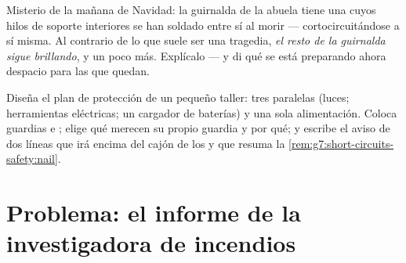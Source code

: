 \begin{exercise}[$\star\star$]\label{exo:g7:short-circuits-safety:11}
Misterio de la mañana de Navidad: la guirnalda  de la abuela
tiene una  cuyos hilos de soporte interiores se han soldado
entre sí al morir --- cortocircuitándose a sí misma. Al contrario de
lo que suele ser una tragedia, \emph{el resto de la guirnalda sigue
brillando}, y un poco más. Explícalo --- y di qué se está preparando
ahora despacio para las  que quedan.
\end{exercise}

\begin{exercise}[$\star\star\star$]\label{exo:g7:short-circuits-safety:12}
Diseña el plan de protección de un pequeño taller: tres 
paralelas (luces; herramientas eléctricas; un cargador de
baterías) y una sola alimentación. Coloca guardias e
; elige qué  merecen su propio guardia y por
qué; y escribe el aviso de dos líneas que irá encima del cajón de los
 y que resuma la
\cref{rem:g7:short-circuits-safety:nail}.
\end{exercise}

\section{Problema: el informe de la investigadora de incendios}

